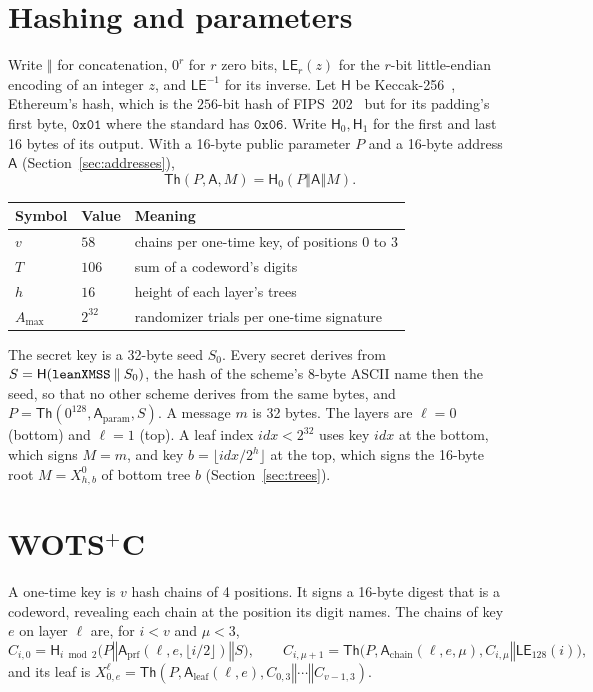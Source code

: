 \documentclass[11pt]{article}
\newcommand{\Th}{\mathsf{Th}}
\newcommand{\hash}{\mathsf{H}}
\newcommand{\LE}{\mathsf{LE}}
\newcommand{\concat}{\mathbin\Vert}
\newcommand{\idx}{\mathit{idx}}
\newcommand{\addr}{\mathsf{A}}
\newcommand{\amax}{A_{\max}}
\begin{document}
\section{Hashing and parameters}

Write $\concat$ for concatenation, $0^r$ for $r$ zero bits, $\LE_r(z)$ for the $r$-bit little-endian encoding of an integer $z$, and $\LE^{-1}$ for its inverse. Let $\hash$ be Keccak-256~\cite{keccak}, Ethereum's hash, which is the $256$-bit hash of FIPS~202~\cite{fips202} but for its padding's first byte, $\mathtt{0x01}$ where the standard has $\mathtt{0x06}$. Write $\hash_0,\hash_1$ for the first and last 16 bytes of its output. With a 16-byte public parameter $P$ and a 16-byte address $\addr$ (Section~\ref{sec:addresses}),
\[
  \Th(P,\addr,M)=\hash_0(P\concat\addr\concat M).
\]

\begin{center}
\begin{tabular}{@{}lll@{}}
\toprule
Symbol & Value & Meaning\\
\midrule
$v$ & $58$ & chains per one-time key, of positions $0$ to $3$\\
$T$ & $106$ & sum of a codeword's digits\\
$h$ & $16$ & height of each layer's trees\\
$\amax$ & $2^{32}$ & randomizer trials per one-time signature\\
\bottomrule
\end{tabular}
\end{center}

The secret key is a 32-byte seed $S_0$. Every secret derives from $S=\hash(\text{\texttt{leanXMSS}}\concat S_0)$, the hash of the scheme's 8-byte ASCII name then the seed, so that no other scheme derives from the same bytes, and $P=\Th(0^{128},\addr_{\mathrm{param}},S)$. A message $m$ is 32 bytes. The layers are $\ell=0$ (bottom) and $\ell=1$ (top). A leaf index $\idx<2^{32}$ uses key $\idx$ at the bottom, which signs $M=m$, and key $b=\lfloor\idx/2^h\rfloor$ at the top, which signs the 16-byte root $M=X^0_{h,b}$ of bottom tree $b$ (Section~\ref{sec:trees}).

\section{\texorpdfstring{WOTS$^+$C}{WOTS+C}}
\label{sec:ots}

A one-time key is $v$ hash chains of 4 positions. It signs a 16-byte digest that is a codeword, revealing each chain at the position its digit names. The chains of key $e$ on layer $\ell$ are, for $i<v$ and $\mu<3$,
\[
  C_{i,0}=\hash_{i\bmod2}\bigl(P\concat\addr_{\mathrm{prf}}(\ell,e,\lfloor i/2\rfloor)\concat S\bigr),\qquad
  C_{i,\mu+1}=\Th\bigl(P,\addr_{\mathrm{chain}}(\ell,e,\mu),C_{i,\mu}\concat\LE_{128}(i)\bigr),
\]
and its leaf is $X^\ell_{0,e}=\Th(P,\addr_{\mathrm{leaf}}(\ell,e),C_{0,3}\concat\cdots\concat C_{v-1,3})$.
\end{document}
